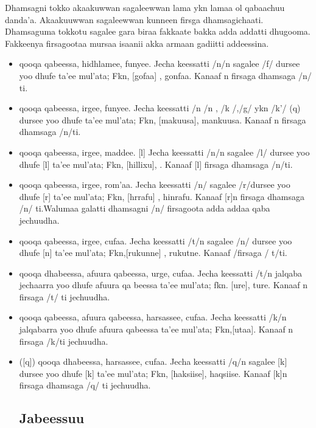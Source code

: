 \documentclass[11pt,b5paper]{book}
\begin{document}
Dhamsagni tokko akaakuwwan sagaleewwan lama ykn lamaa ol  qabaachuu danda’a. Akaakuuwwan sagaleewwan kunneen  firsga dhamsagichaati. Dhamsaguma tokkotu sagalee gara  biraa fakkaate bakka adda addatti dhugooma. Fakkeenya firsagootaa mursaa isaanii akka armaan gadiitti addeessina. 
\begin{itemize}
        \item \textipa{[M]} qooqa qabeessa, hidhlamee, funyee. Jecha keessatti /n/n sagalee /f/ dursee yoo dhufe \textipa{[M]} ta’ee  mul’ata; Fkn, [go\textipa{[M]}faa] , gonfaa. Kanaaf \textipa{[M]} n firsaga  dhamsaga /n/ ti.
        \item \textipa{[N]} qooqa qabeessa, irgee, funyee. Jecha keessatti  /n /n , /k /,/g/ ykn /k’/ (q) dursee yoo dhufe \textipa{[N]} ta’ee  mul’ata; Fkn, [ma\textipa{[N]}kuusa], mankuusa. Kanaaf \textipa{[N]}n  firsaga dhamsaga /n/ti.
        \item \textipa{[l]} qooqa qabeessa, irgee, maddee. [l] Jecha keessatti  /n/n sagalee /l/ dursee yoo dhufe [l] ta’ee mul’ata;  Fkn, [hillixu], . Kanaaf [l] firsaga dhamsaga /n/ti.
        \item \textipa{[r]} qooqa qabeessa, irgee, rom’aa. Jecha keessatti /n/ sagalee /r/dursee yoo dhufe [r] ta’ee mul’ata; Fkn, [hrrafu] , hinrafu. Kanaaf [r]n firsaga dhamsaga /n/ ti.Walumaa galatti dhamsagni /n/ firsagoota adda addaa  qaba jechuudha.
        \item \textipa{[t]} qooqa qabeessa, irgee, cufaa. Jecha keessatti  /t/n sagalee /n/ dursee yoo dhufe [n] ta’ee mul’ata;  Fkn,[rukunne] , rukutne. Kanaaf /firsaga / t/ti.
        \item \textipa{[t\super h]} qooqa dhabeessa, afuura qabeessa, urge, cufaa. Jecha  keessatti /t/n jalqaba jechaarra yoo dhufe afuura qa beessa ta’ee mul’ata; fkn. [\textipa{[t\super h]}ure], ture. Kanaaf \textipa{[t\super h]} n  firsaga /t/ ti jechuudha.
        \item \textipa{[k\super h]}qooqa qabeessa, afuura qabeessa,  harsassee, cufaa. Jecha keessatti /k/n jalqabarra yoo  dhufe afuura qabeessa ta’ee mul’ata; Fkn,[\textipa{[k\super h]}utaa]. Kanaaf \textipa{[k\super h]}n firsaga /k/ti jechuudha.
        \item \textipa{[k']} ([q]) qooqa dhabeessa, harsassee, cufaa. Jecha  keessatti /q/n sagalee [k] dursee yoo dhufe [k] ta’ee  mul’ata; Fkn, [haksiise], haqsiise. Kanaaf [k]n firsaga  dhamsaga /q/ ti jechuudha.

\subsection{Jabeessuu}


\end{itemize}
\end{document}
